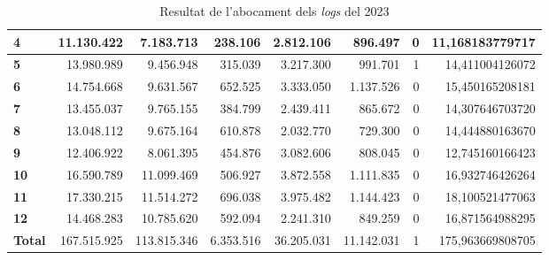 \begin{table}[h!]
\begin{adjustbox}{width=1.2\textwidth, center}
\begin{tabular}{|l|r|r|r|r|r|r|r|}
            \textbf{4}     & 11.130.422  & 7.183.713   & 238.106   & 2.812.106  & 896.497    & 0 & 11,168183779717  \\
            \midrule
            \textbf{5}     & 13.980.989  & 9.456.948   & 315.039   & 3.217.300  & 991.701    & 1 & 14,411004126072  \\
            \textbf{6}     & 14.754.668  & 9.631.567   & 652.525   & 3.333.050  & 1.137.526  & 0 & 15,450165208181  \\
            \textbf{7}     & 13.455.037  & 9.765.155   & 384.799   & 2.439.411  & 865.672    & 0 & 14,307646703720  \\
            \textbf{8}     & 13.048.112  & 9.675.164   & 610.878   & 2.032.770  & 729.300    & 0 & 14,444880163670  \\
            \midrule
            \textbf{9}     & 12.406.922  & 8.061.395   & 454.876   & 3.082.606  & 808.045    & 0 & 12,745160166423  \\
            \textbf{10}    & 16.590.789  & 11.099.469  & 506.927   & 3.872.558  & 1.111.835  & 0 & 16,932746426264  \\
            \textbf{11}    & 17.330.215  & 11.514.272  & 696.038   & 3.975.482  & 1.144.423  & 0 & 18,100521477063  \\
            \textbf{12}    & 14.468.283  & 10.785.620  & 592.094   & 2.241.310  & 849.259    & 0 & 16,871564988295  \\
            \midrule
            \textbf{Total} & 167.515.925 & 113.815.346 & 6.353.516 & 36.205.031 & 11.142.031 & 1 & 175,963669808705 \\
            \bottomrule
        \end{tabular}
    \end{adjustbox}
    \caption{Resultat de l'abocament dels \textit{logs} del 2023}
    \label{tab:logs-table-2023}
\end{table}
